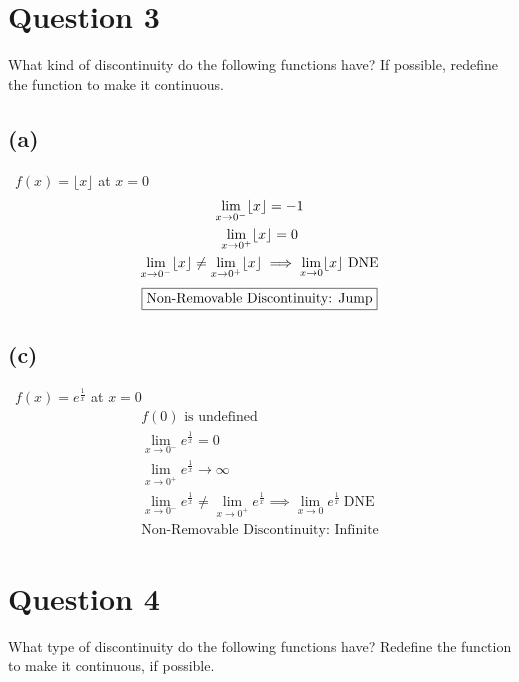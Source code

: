 \documentclass[12pt]{article}
\newcommand{\floor}[1]{\lfloor #1 \rfloor}
\begin{document}
\section{Question 3}
What kind of discontinuity do the following functions have? If possible, redefine the function to
make it continuous.

\subsection{(a)} \, $f(x)=\lfloor x\rfloor$ at $x=0$
\begin{gather*}
    \lim_{x\to0^-}\floor{x} =-1\\
    \lim_{x\to0^+}\floor{x} =0\\
    \lim_{x\to0^-}\floor{x} \ne \lim_{x\to0^+}\floor{x} \implies \lim_{x \to 0} \floor{x} \ \mathrm{DNE}\vspace{0.3em} \\
    \boxed{\text{Non-Removable Discontinuity: Jump}}
\end{gather*}

\subsection{(c)} \, $f(x)=e^\frac{1}{x}$ at $x=0$
\begin{gather*}
    f(0) \text{ is undefined}\\
    \lim_{x\to 0^-}e^\frac{1}{x}=0\\
    \lim_{x\to 0^+}e^\frac{1}{x}\to \infty\\
    \lim_{x\to 0^-}e^\frac{1}{x} \ne \lim_{x\to 0^+}e^\frac{1}{x} \implies \lim_{x\to0}e^\frac{1}{x} \ \mathrm{DNE}\\
    \boxed{\text{Non-Removable Discontinuity: Infinite}}
\end{gather*}

\section{Question 4}
What type of discontinuity do the following functions have? Redefine the function to make it
continuous, if possible. \vspace{0.3em}
\end{document}
